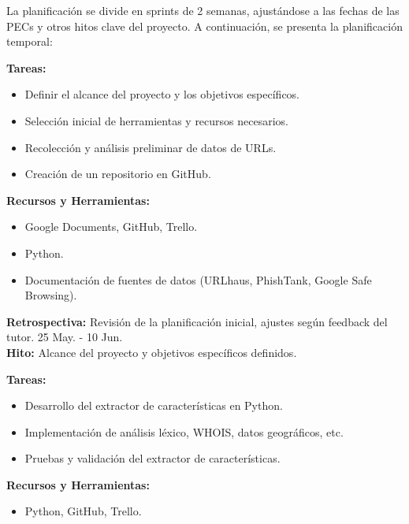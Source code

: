 La planificación se divide en sprints de 2 semanas, ajustándose a las fechas de las PECs y otros hitos clave del proyecto. A continuación, se presenta la planificación temporal: 

\begin{tcolorbox}[phasebox, title=Fases del trabajo]
    \small
    \begin{tcolorbox}[sprintbox, title=Sprint 1: Definición del Proyecto y Recolección de Datos]
        \textbf{Tareas:}
        \begin{itemize}
            \item Definir el alcance del proyecto y los objetivos específicos.
            \item Selección inicial de herramientas y recursos necesarios.
            \item Recolección y análisis preliminar de datos de URLs.
            \item Creación de un repositorio en GitHub.
        \end{itemize}
        \textbf{Recursos y Herramientas:}
        \begin{itemize}
            \item Google Documents, GitHub, Trello.
            \item Python.
            \item Documentación de fuentes de datos (URLhaus, PhishTank, Google Safe Browsing).
        \end{itemize}
        \textbf{Retrospectiva:} Revisión de la planificación inicial, ajustes según feedback del tutor. 25 May. - 10 Jun.\\
        \textbf{Hito:} Alcance del proyecto y objetivos específicos definidos.
    \end{tcolorbox}


    \begin{tcolorbox}[sprintbox, title= Sprint 2 y 3: Desarrollo del Extractor de Características.]
    
        \textbf{Tareas:}
        \begin{itemize}
            \item Desarrollo del extractor de características en Python.
            \item Implementación de análisis léxico, WHOIS, datos geográficos, etc.
            \item Pruebas y validación del extractor de características.
            
        \end{itemize}
        \textbf{Recursos y Herramientas:}
        \begin{itemize}
            \item Python, GitHub, Trello.


\end{itemize}
\end{tcolorbox}
\end{tcolorbox}
